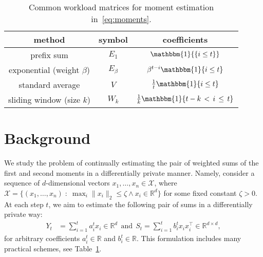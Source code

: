 \begin{table}[t]
    \centering
    \begin{tabular}{c|c|c}
       \textbf{method} & \textbf{symbol} & \textbf{coefficients} \\\hline
         prefix sum  & $E_1$ &  $\mathbbm{1}{\{i \leq t\}}$ \\  %
         exponential (weight $\beta$) & $E_{\beta}$ & $\beta^{t-i}\mathbbm{1}\{i \leq t\}$ \\
         standard average & $V$ & $\frac{1}{t}\mathbbm{1}\{i \leq t\}$ \\
         sliding window (size $k$) & $W_k$ &  $\frac{1}{k}\mathbbm{1}\{t-k\,<\,i\,\leq\,t\}$ \\
    \end{tabular}
    \caption{Common workload matrices for moment estimation in~\eqref{eq:moments}.}
    \label{tab:matrixentries}
\end{table}

\section{Background}\label{sec:background}


We study the problem of continually estimating the pair of weighted sums of the first and second moments in a differentially private manner. Namely, consider a sequence of $d$-dimensional vectors $x_1, \dots, x_n\in\mathcal{X}$, where $\mathcal{X}=\{(x_1,\dots,x_n)\;:\;\max_i \|x_i\|_2\leq \zeta \wedge x_i \in\mathbb{R}^{d}\}$ for some fixed constant $\zeta>0$. At each step $t$, we aim to estimate the following pair of sums in a differentially private way:
%
\begin{align}
 Y_t &= \sum\limits_{i = 1}^{t} a^t_{i} x_i \in \mathbb{R}^{d} \ \ \text{and} \  \ S_t =\sum\limits_{i = 1}^{t} b^t_{i} x_i x_i^{\top} \in \mathbb{R}^{d \times d},
\label{eq:moments}
\end{align}
%
for arbitrary coefficients $a^t_{i} \in \mathbb R$ and $b^t_{i} \in \mathbb R$.
%
This formulation includes many practical schemes, see Table~\ref{tab:matrixentries}.


